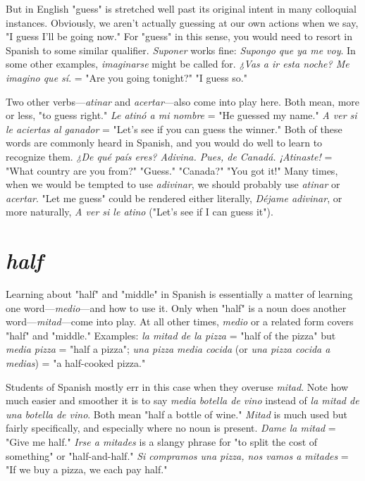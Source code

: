But in English "guess" is stretched well past its original intent
in many colloquial instances. Obviously, we aren't actually guessing at
our own actions when we say, "I guess I'll be going now." For "guess"
in this sense, you would need to resort in Spanish to some similar
qualifier. \emph{Suponer} works fine: \emph{Supongo que ya me voy}. In some other
examples, \emph{imaginarse} might be called for. \emph{¿Vas a ir esta noche? Me
imagino que sí}. = "Are you going tonight?" "I guess so."

Two other verbs---\emph{atinar} and \emph{acertar}---also come into play
here. Both mean, more or less, "to guess right." \emph{Le atinó a mi nombre}
= "He guessed my name." \emph{A ver si le aciertas al ganador} = "Let's see
if you can guess the winner." Both of these words are commonly heard
in Spanish, and you would do well to learn to recognize them. \emph{¿De qué
país eres? Adivina. Pues, de Canadá. ¡Atinaste!} = "What country are
you from?" "Guess." "Canada?" "You got it!" Many times, when we
would be tempted to use \emph{adivinar}, we should probably use \emph{atinar} or
\emph{acertar}. "Let me guess" could be rendered either literally, \emph{Déjame adivinar}, or more naturally, \emph{A ver si le atino} ("Let's see if I can guess it").

\section{\emph{half}}

Learning about "half" and "middle" in Spanish is essentially a
matter of learning one word---\emph{medio}---and how to use it. Only when
"half" is a noun does another word---\emph{mitad}---come into play. At all
other times, \emph{medio} or a related form covers "half" and "middle." Examples: \emph{la mitad de la pizza} = "half of the pizza" but \emph{media pizza} =
"half a pizza"; \emph{una pizza media cocida} (or \emph{una pizza cocida a medias})
= "a half-cooked pizza."

Students of Spanish mostly err in this case when they overuse
\emph{mitad}. Note how much easier and smoother it is to say \emph{media botella
de vino} instead of \emph{la mitad de una botella de vino}. Both mean "half a
bottle of wine." \emph{Mitad} is much used but fairly specifically, and especially where no noun is present. \emph{Dame la mitad} = "Give me half."
\emph{Irse a mitades} is a slangy phrase for "to split the cost of something" or
"half-and-half." \emph{Si compramos una pizza, nos vamos a mitades} = "If
we buy a pizza, we each pay half."

